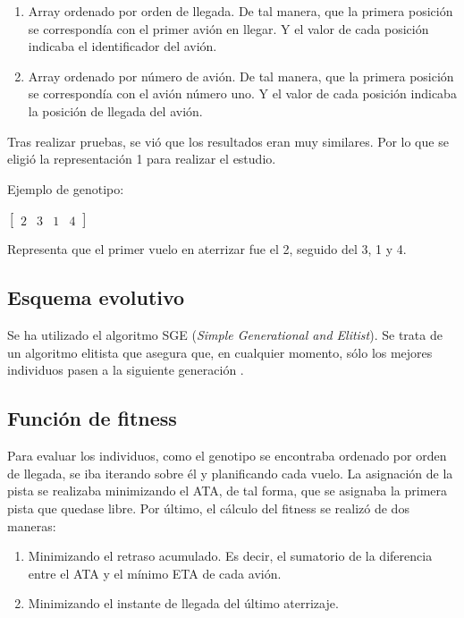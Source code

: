 \documentclass[a4paper,12pt,titlepage]{article}
\begin{document}
\begin{enumerate}[noitemsep]
	\item Array ordenado por orden de llegada. De tal manera, que la primera posición se correspondía con el primer avión en llegar. Y el valor de cada posición indicaba el identificador del avión.
	\item Array ordenado por número de avión. De tal manera, que la primera posición se correspondía con el avión número uno. Y el valor de cada posición indicaba la posición de llegada del avión.
\end{enumerate}

Tras realizar pruebas, se vió que los resultados eran muy similares. Por lo que se eligió la representación 1 para realizar el estudio.

Ejemplo de genotipo:

\begin{center}
$
\begin{bmatrix}
	2 & 3 & 1 & 4
\end{bmatrix}
$
\end{center}

Representa que el primer vuelo en aterrizar fue el 2, seguido del 3, 1 y 4.

\subsection{Esquema evolutivo}

Se ha utilizado el algoritmo SGE (\textit{Simple Generational and Elitist}). Se trata de un algoritmo elitista que asegura que, en cualquier momento, sólo los mejores individuos pasen a la siguiente generación \citep{jclec:sge}.

\subsection{Función de fitness}

Para evaluar los individuos, como el genotipo se encontraba ordenado por orden de llegada, se iba iterando sobre él y planificando cada vuelo. La asignación de la pista se realizaba minimizando el ATA, de tal forma, que se asignaba la primera pista que quedase libre. Por último, el cálculo del fitness se realizó de dos maneras:

\begin{enumerate}[noitemsep]
	\item Minimizando el retraso acumulado. Es decir, el sumatorio de la diferencia entre el ATA y el mínimo ETA de cada avión.
	\item Minimizando el instante de llegada del último aterrizaje.
\end{enumerate}
\end{document}
